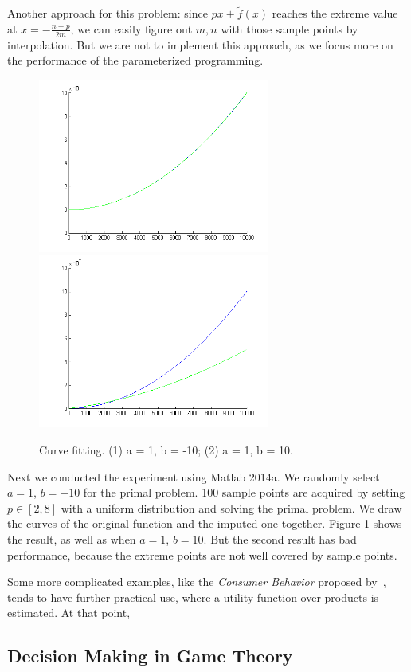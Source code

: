 Another approach for this problem: since $px+\tilde{f}(x)$ reaches the extreme value at $x=-\frac{n+p}{2m}$, we can easily figure out $m,n$ with those sample points by interpolation. But we are not to implement this approach, as we focus more on the performance of the parameterized programming.

\begin{figure}\label{fig:case1}
\centering
\includegraphics[width=3in]{plots/p1.png}
\includegraphics[width=3in]{plots/p2.png}
\caption{Curve fitting. (1) a = 1, b = -10; (2) a = 1, b = 10.}
\end{figure}

Next we conducted the experiment using Matlab 2014a. We randomly select $a=1$, $b=-10$ for the primal problem. 100 sample points are acquired by setting $p\in[2,8]$ with a uniform distribution and solving the primal problem. We draw the curves of the original function and the imputed one together. Figure 1 shows the result, as well as when $a=1$, $b=10$. But the second result has bad performance, because the extreme points are not well covered by sample points.

Some more complicated examples, like the \textit{Consumer Behavior} proposed by~\cite{keshavarz2011}, tends to have further practical use, where a utility function over products is estimated. At that point,

\subsection{Decision Making in Game Theory}

